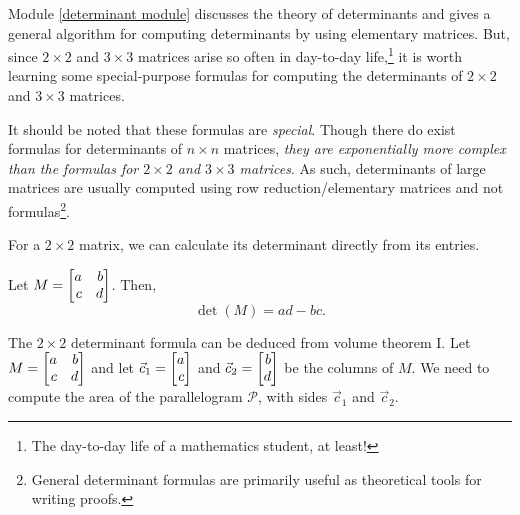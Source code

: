 Module \ref{determinant module} discusses the theory of determinants and gives a general algorithm
for computing determinants by using elementary matrices. But, since $2\times 2$ and $3\times 3$
matrices arise so often in day-to-day life,\footnote{ The day-to-day life of a mathematics student, at least!}
it is worth learning some special-purpose formulas for computing the determinants of $2\times 2$ and $3\times 3$
matrices.

It should be noted that these formulas are \emph{special}. Though there do exist
formulas for determinants of $n\times n$ matrices, \emph{they are exponentially more complex
than the formulas for $2\times 2$ and $3\times 3$ matrices}. As such, determinants of large matrices
are usually computed using row reduction/elementary matrices and not formulas\footnote{
	General determinant formulas are primarily useful as theoretical tools for writing proofs.}.


For a $2\times 2$ matrix, we can calculate its determinant directly from its entries.

\begin{theorem}
	Let $M=\mat{a & b \\ c & d}$. Then,
	\[
		\det(M)=ad-bc.
	\]
\end{theorem}

The $2\times 2$ determinant formula can be deduced from volume theorem I.
Let $M=\mat{a&b\\c&d}$ and let $\vec c_1=\mat{a\\c}$ and $\vec c_2=\mat{b\\d}$ be the columns of $M$.
We need to compute the area of the parallelogram $\mathcal P$, with sides $\vec c_1$ and $\vec c_2$.

\begin{center}
\end{center}

